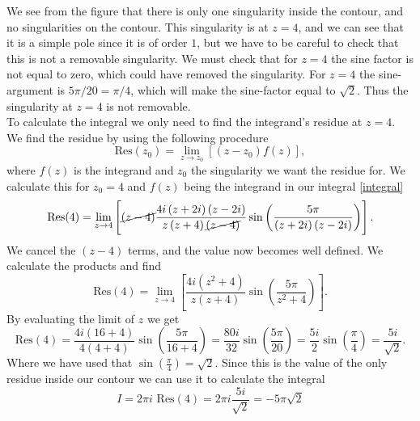 \documentclass[12pt,twoside]{article}
\begin{document}
We see from the figure that there is only one singularity inside the contour, and no singularities on the contour. This singularity is at $z=4$, and we can see that it is a simple pole since it is of order $1$, but we have to be careful to check that this is not a removable singularity. We must check that for $z=4$ the sine factor is not equal to zero, which could have removed the singularity. For $z=4$ the sine-argument is $5\pi/20=\pi/4$, which will make the sine-factor equal to $\sqrt{2}$. Thus the singularity at $z=4$ is not removable.\\
To calculate the integral we only need to find the integrand's residue at $z=4$. We find the residue by using the following procedure
\begin{equation}
  \text{Res}(z_0) = \lim_{z \to z_0} \left[(z-z_0)f(z)\right],
\end{equation}
where $f(z)$ is the integrand and $z_0$ the singularity we want the residue for. We calculate this for $z_0=4$ and $f(z)$ being the integrand in our integral \eqref{integral}
\begin{equation}
    \text{Res}(4) = \lim_{z \to 4}\left[\cancel{(z-4)}\frac{4i\left(z+2i\right)\left(z-2i\right)}{z\left(z+4\right)\cancel{\left(z-4\right)}}\sin{\left( \frac{5\pi}{\left(z+2i\right)\left(z-2i\right)} \right)}\right].
\end{equation}
We cancel the $(z-4)$ terms, and the value now becomes well defined. We calculate the products and find
\begin{equation}
    \text{Res}(4) = \lim_{z \to 4}\left[\frac{4i\left(z^2+4\right)}{z\left(z+4\right)}\sin{\left( \frac{5\pi}{z^2+4} \right)}\right].
\end{equation}
By evaluating the limit of $z$ we get
\begin{equation}
    \text{Res}(4) = \frac{4i\left(16+4\right)}{4\left(4+4\right)}\sin{\left( \frac{5\pi}{16+4} \right)} = \frac{80i}{32}\sin{\left( \frac{5\pi}{20} \right)} = \frac{5i}{2}\sin{\left(\frac{\pi}{4}\right)} = \frac{5i}{\sqrt{2}}.
\end{equation}
Where we have used that $\sin{\left(\frac{\pi}{4}\right)}=\sqrt{2}$. Since this is the value of the only residue inside our contour we can use it to calculate the integral
\begin{equation}
  I  = 2\pi i\,\,\text{Res}(4) = 2\pi i\frac{5i}{\sqrt{2}} = -5\pi\sqrt{2}
\end{equation}
\newpage
\end{document}
